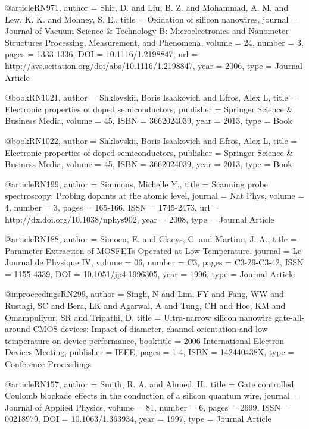 @article{RN971,
   author = {Shir, D. and Liu, B. Z. and Mohammad, A. M. and Lew, K. K. and Mohney, S. E.},
   title = {Oxidation of silicon nanowires},
   journal = {Journal of Vacuum Science & Technology B: Microelectronics and Nanometer Structures Processing, Measurement, and Phenomena},
   volume = {24},
   number = {3},
   pages = {1333-1336},
   DOI = {10.1116/1.2198847},
   url = {http://avs.scitation.org/doi/abs/10.1116/1.2198847},
   year = {2006},
   type = {Journal Article}
}

@book{RN1021,
   author = {Shklovskii, Boris Isaakovich and Efros, Alex L},
   title = {Electronic properties of doped semiconductors},
   publisher = {Springer Science & Business Media},
   volume = {45},
   ISBN = {3662024039},
   year = {2013},
   type = {Book}
}

@book{RN1022,
   author = {Shklovskii, Boris Isaakovich and Efros, Alex L},
   title = {Electronic properties of doped semiconductors},
   publisher = {Springer Science & Business Media},
   volume = {45},
   ISBN = {3662024039},
   year = {2013},
   type = {Book}
}

@article{RN199,
   author = {Simmons, Michelle Y.},
   title = {Scanning probe spectroscopy: Probing dopants at the atomic level},
   journal = {Nat Phys},
   volume = {4},
   number = {3},
   pages = {165-166},
   ISSN = {1745-2473},
   url = {http://dx.doi.org/10.1038/nphys902},
   year = {2008},
   type = {Journal Article}
}

@article{RN188,
   author = {Simoen, E. and Claeys, C. and Martino, J. A.},
   title = {Parameter Extraction of MOSFETs Operated at Low Temperature},
   journal = {Le Journal de Physique IV},
   volume = {06},
   number = {C3},
   pages = {C3-29-C3-42},
   ISSN = {1155-4339},
   DOI = {10.1051/jp4:1996305},
   year = {1996},
   type = {Journal Article}
}

@inproceedings{RN299,
   author = {Singh, N and Lim, FY and Fang, WW and Rustagi, SC and Bera, LK and Agarwal, A and Tung, CH and Hoe, KM and Omampuliyur, SR and Tripathi, D},
   title = {Ultra-narrow silicon nanowire gate-all-around CMOS devices: Impact of diameter, channel-orientation and low temperature on device performance},
   booktitle = {2006 International Electron Devices Meeting},
   publisher = {IEEE},
   pages = {1-4},
   ISBN = {142440438X},
   type = {Conference Proceedings}
}

@article{RN157,
   author = {Smith, R. A. and Ahmed, H.},
   title = {Gate controlled Coulomb blockade effects in the conduction of a silicon quantum wire},
   journal = {Journal of Applied Physics},
   volume = {81},
   number = {6},
   pages = {2699},
   ISSN = {00218979},
   DOI = {10.1063/1.363934},
   year = {1997},
   type = {Journal Article}
}

